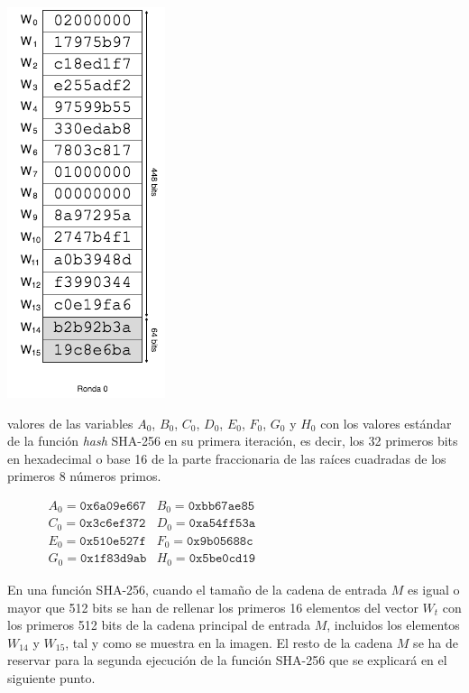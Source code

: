 \documentclass{article}
\begin{document}
    \noindent\begin{minipage}{0.23\textwidth}
    \includegraphics[scale=0.59]{img/Bitcoin_block_SHA_256_W0_W15_ronda_0}
    \end{minipage}
    \hfill
    \begin{minipage}{0.67\textwidth}
     valores de las variables $A_{0}$, $B_{0}$, $C_{0}$, $D_{0}$, $E_{0}$, $F_{0}$, $G_{0}$ y $H_{0}$ con los valores estándar de la función \textit{hash} SHA-256 en su primera iteración, es decir, los 32 primeros bits en hexadecimal o base 16 de la parte fraccionaria de las raíces cuadradas de los primeros 8 números primos.
    
    \begin{figure}[H]
    \centering
        $\begin{array}{rr}
            A_{0} = \texttt{0x6a09e667} & B_{0} = \texttt{0xbb67ae85} \\
            C_{0} = \texttt{0x3c6ef372} & D_{0} = \texttt{0xa54ff53a} \\
            E_{0} = \texttt{0x510e527f} & F_{0} = \texttt{0x9b05688c} \\
            G_{0} = \texttt{0x1f83d9ab} & H_{0} = \texttt{0x5be0cd19}
        \end{array}$
    \end{figure}
    
    En una función SHA-256, cuando el tamaño de la cadena de entrada $M$ es igual o mayor que 512 bits se han de rellenar los primeros 16 elementos del vector $W_t$ con los primeros 512 bits de la cadena principal de entrada $M$, incluidos los elementos $W_{14}$ y $W_{15}$, tal y como se muestra en la imagen. El resto de la cadena $M$ se ha de reservar para la segunda ejecución de la función SHA-256 que se explicará en el siguiente punto.
    \end{minipage}
    
\end{document}
